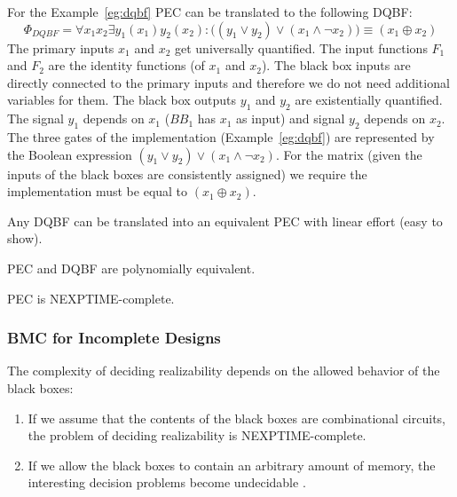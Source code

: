 \documentclass[runningheads]{llncs}
\begin{document}
\begin{example}
  For the Example~\ref{eg:dqbf} PEC can be translated to the following DQBF:
\begin{equation} \nonumber
  \Phi_{DQBF} = \forall x_1 x_2 \exists y_1 (x_1) y_2 (x_2) :
  \big( (y_1 \lor y_2) \lor (x_1 \land \neg x_2) \big) \equiv (x_1 \oplus x_2)
\end{equation}
The primary inputs $x_1$ and $x_2$ get universally quantified.
The input functions $F_1$ and $F_2$ are the identity functions (of $x_1$ and $x_2$).
The black box inputs are directly connected to the primary inputs and therefore we do not need additional variables for them.
The black box outputs $y_1$ and $y_2$ are existentially quantified.
The signal $y_1$ depends on $x_1$ ($BB_1$ has $x_1$ as input) and signal $y_2$ depends on $x_2$.
The three gates of the implementation (Example~\ref{eg:dqbf}) are represented by the Boolean expression $(y_1 \lor y_2) \lor (x_1 \land \neg x_2)$.
For the matrix (given the inputs of the black boxes are consistently assigned) we require the implementation must be equal to $(x_1 \oplus x_2)$.
\end{example}

\begin{lemma}
  Any DQBF can be translated into an equivalent PEC with linear effort (easy to show).
\end{lemma}

\begin{theorem}
  PEC and DQBF are polynomially equivalent.
\end{theorem}

\begin{corollary}
  PEC is NEXPTIME-complete.
\end{corollary}

\subsubsection{BMC for Incomplete Designs \cite{drechsler2018formal}}
The complexity of deciding realizability depends on the allowed behavior of the black boxes:
\begin{enumerate}
  \item If we assume that the contents of the black boxes are combinational circuits, the problem of deciding realizability is NEXPTIME-complete.
  \item If we allow the black boxes to contain an arbitrary amount of memory, the interesting decision problems become undecidable \cite{pnuelir90}.
\end{enumerate}
\end{document}
